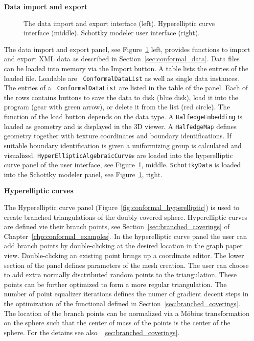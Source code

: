 \documentclass[Thesis.tex]{subfiles}
\begin{document}
{\bf Data import and export}

\begin{figure}
\caption{The data import and export interface (left).
Hyperelliptic curve interface (middle).
Schottky modeler user interface (right).}
\label{fig:data_interfaces}
\end{figure}

The data import and export panel, see Figure~\ref{fig:data_interfaces} left, provides
functions to import and export XML data as described in
Section~\ref{sec:conformal_data}.  Data files can be loaded into memory via the
Import button. A table lists the entries of the loaded file.  Loadable are {\tt
ConformalDataList} as well as single data instances. The entries of a {\tt
ConformalDataList} are listed in the table of the panel. Each of the rows
contains buttons to save the data to disk (blue disk), load it into the program
(gear with green arrow), or delete it from the list (red circle).  The function
of the load button depends on the data type. A {\tt HalfedgeEmbedding} is
loaded as geometry and is displayed in the 3D viewer. A {\tt HalfedgeMap}
defines geometry together with texture coordinates and boundary
identifications. If suitable boundary identification is given a uniformizing
group is calculated and visualized. {\tt HyperEllipticAlgebraicCurve}s are
loaded into the hyperelliptic curve panel of the user interface, see
Figure~\ref{fig:data_interfaces}, middle.  {\tt SchottkyData} is loaded into
the Schottky modeler panel, see Figure~\ref{fig:data_interfaces}, right.


{\bf Hyperelliptic curves}

The Hyperelliptic curve panel (Figure~\ref{fig:conformal_hyperelliptic}) is
used to create branched triangulations of the doubly covered sphere.
Hyperelliptic curves are defined vie their branch points, see
Section~\ref{sec:branched_coverings} of Chapter~\ref{chp:conformal_examples}.
In the hyperelliptic curve panel the user can add branch points by
double-clicking at the desired location in the graph paper view.
Double-clicking an existing point brings up a coordinate editor. The lower
section of the panel defines parameters of the mesh creation. The user can
choose to add extra normally disctributed random points to the triangulation.
These points can be further optimized to form a more regular triangulation.
The number of point equalizer iterations defines the numer of gradient decent
steps in the optimization of the functional defined in
Section~\ref{sec:branched_coverings}.  The location of the branch points can be
normalized via a M{\"o}bius transformation on the sphere such that the
center of mass of the points is the center of the sphere. For the detains see also~
\ref{sec:branched_coverings}.
\end{document}
